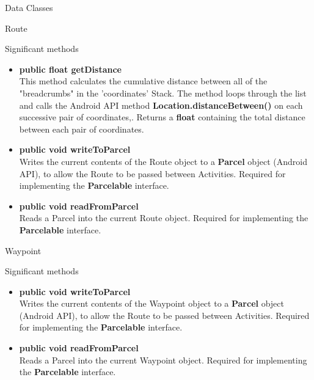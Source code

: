 \documentclass{article}
\begin{document}
\begin{section}{Data Classes}
\begin{subsection}{Route}
			\begin{subsubsection}{Significant methods}
				\begin{itemize}
					\item{{\bf public float getDistance} \\
					This method calculates the cumulative distance between all of the "breadcrumbs" in the 'coordinates' Stack. The method loops through the list and calls the Android API method {\bf Location.distanceBetween()} on each successive pair of coordinates,. Returns a {\bf float} containing the total distance between each pair of coordinates.}
					
					\item{{\bf public void writeToParcel} \\
					Writes the current contents of the Route object to a {\bf Parcel} object (Android API), to allow the Route to be passed between Activities. Required for implementing the {\bf Parcelable} interface.}
					
					\item{{\bf public void readFromParcel} \\
					Reads a Parcel into the current Route object. Required for implementing the {\bf Parcelable} interface.}
				\end {itemize}
			\end{subsubsection}
		\end{subsection}
		
		\newpage
		\begin{subsection}{Waypoint}
			\begin{subsubsection}{Significant methods}
				\begin{itemize}
					\item{{\bf public void writeToParcel} \\
					Writes the current contents of the Waypoint object to a {\bf Parcel} object (Android API), to allow the Route to be passed between Activities. Required for implementing the {\bf Parcelable} interface.}
					
					\item{{\bf public void readFromParcel} \\
					Reads a Parcel into the current Waypoint object. Required for implementing the {\bf Parcelable} interface.}
				\end {itemize}
			\end{subsubsection}
		\end{subsection}
	\end{section}
	
\end{document}
